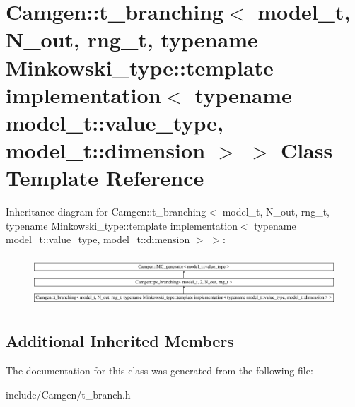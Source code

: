 \hypertarget{a00524}{\section{Camgen\-:\-:t\-\_\-branching$<$ model\-\_\-t, N\-\_\-out, rng\-\_\-t, typename Minkowski\-\_\-type\-:\-:template implementation$<$ typename model\-\_\-t\-:\-:value\-\_\-type, model\-\_\-t\-:\-:dimension $>$ $>$ Class Template Reference}
\label{a00524}
}
Inheritance diagram for Camgen\-:\-:t\-\_\-branching$<$ model\-\_\-t, N\-\_\-out, rng\-\_\-t, typename Minkowski\-\_\-type\-:\-:template implementation$<$ typename model\-\_\-t\-:\-:value\-\_\-type, model\-\_\-t\-:\-:dimension $>$ $>$\-:\begin{figure}[H]
\begin{center}
\leavevmode
\includegraphics[height=1.887640cm]{a00524}
\end{center}
\end{figure}
\subsection*{Additional Inherited Members}


The documentation for this class was generated from the following file\-:\begin{DoxyCompactItemize}
\item 
include/\-Camgen/t\-\_\-branch.\-h\end{DoxyCompactItemize}
